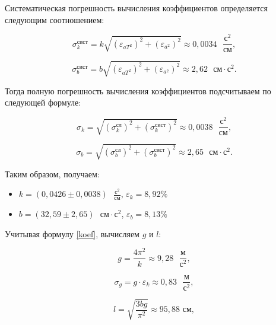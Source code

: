 \documentclass[a4paper,12pt]{article} %
\begin{document}
Систематическая погрешность вычисления коэффициентов определяется следующим соотношением:

\begin{equation}
\sigma^\text{сист}_k = k\sqrt{\left( \varepsilon_{aT^2} \right)^2 + \left( \varepsilon_{a^2} \right)^2 } \approx 0,0034 \text{ }\frac{\text{с}^2}{\text{см}},
\end{equation}

\begin{equation}
\sigma^\text{сист}_b = b\sqrt{\left( \varepsilon_{aT^2} \right)^2 + \left( \varepsilon_{a^2} \right)^2 } \approx  2,62 \text{ }\text{см}\cdot\text{с}^2.
\end{equation}

Тогда полную погрешность вычисления коэффициентов подсчитываем по следующей формуле:

\begin{equation}
\sigma_k = \sqrt{\left( \sigma_k^\text{сл} \right)^2 + \left( \sigma_k^\text{сист} \right)^2 } \approx 0,0038 \text{ }\frac{\text{с}^2}{\text{см}},
\end{equation}

\begin{equation}
\sigma_b = \sqrt{\left( \sigma_b^\text{сл} \right)^2 + \left( \sigma_b^\text{сист} \right)^2 } \approx 2,65 \text{ }\text{см}\cdot\text{с}^2.
\end{equation}

Таким образом, получаем:
\begin{itemize}
	\item $ k = \left( 0,0426\pm0,0038\right)  \text{ }\frac{\text{с}^2}{\text{см}} $, $ \varepsilon_k = 8,92 \% $
	\item $ b = \left( 32,59\pm2,65\right)  \text{ }\text{см}\cdot\text{с}^2 $, $ \varepsilon_b = 8,13 \% $
\end{itemize}

Учитывая формулу \eqref{koef}, вычисляем $ g $ и $ l $:

\begin{equation}
g = \frac{4\pi^2}{k} \approx 9,28 \text{ }\frac{\text{м}}{\text{с}^2},
\end{equation}

\begin{equation}
\sigma_g = g\cdot\varepsilon_k \approx 0,83 \text{ }\frac{\text{м}}{\text{с}^2},
\end{equation}

\begin{equation}
l=\sqrt{\frac{3bg}{\pi^2}}\approx 95,88 \text{ см},
\end{equation}
\end{document}
